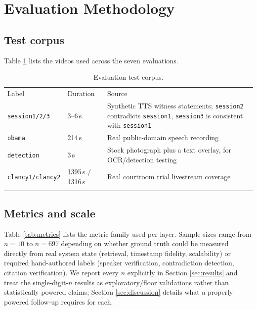 \documentclass[3p,times,procedia]{elsarticle}
\begin{document}
\section{Evaluation Methodology}
\label{sec:evalmethod}

\subsection{Test corpus}

Table \ref{tab:corpus} lists the videos used across the seven evaluations.

\begin{table}[h]
\caption{Evaluation test corpus.}
\label{tab:corpus}
\begin{tabular*}{\hsize}{@{\extracolsep{\fill}}lll@{}}
\toprule
Label & Duration & Source \\
\colrule
\texttt{session1/2/3} & 3--6\,s & Synthetic TTS witness statements; \texttt{session2} contradicts \texttt{session1}, \texttt{session3} is consistent with \texttt{session1} \\
\texttt{obama} & 214\,s & Real public-domain speech recording \\
\texttt{detection} & 3\,s & Stock photograph plus a text overlay, for OCR/detection testing \\
\texttt{clancy1/clancy2} & 1395\,s / 1316\,s & Real courtroom trial livestream coverage \\
\botrule
\end{tabular*}
\end{table}

\subsection{Metrics and scale}

Table \ref{tab:metrics} lists the metric family used per layer. Sample sizes range
from $n=10$ to $n=697$ depending on whether ground truth could be measured directly
from real system state (retrieval, timestamp fidelity, scalability) or required
hand-authored labels (speaker verification, contradiction detection, citation
verification). We report every $n$ explicitly in Section \ref{sec:results} and treat
the single-digit-$n$ results as exploratory/floor validations rather than statistically
powered claims; Section \ref{sec:discussion} details what a properly powered follow-up
requires for each.
\end{document}
